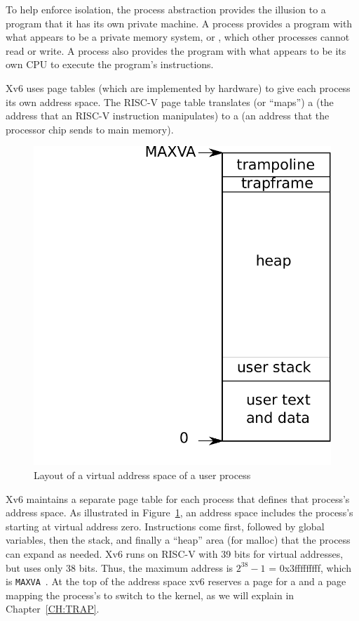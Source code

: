 To help enforce isolation, the process abstraction provides the
illusion to a program that it has its own private machine.  A process provides
a program with what appears to be a private memory system, or
, 
which other processes cannot read or write.
A process also provides the program with what appears to be its own
CPU to execute the program's instructions.

Xv6 uses page tables (which are implemented by hardware) to give each process
its own address space. The RISC-V page table
translates (or ``maps'') a
(the address that an RISC-V instruction manipulates) to a
(an address that the processor chip sends to main memory).

\begin{figure}[t]
\center
\includegraphics[scale=0.5]{fig/as.pdf}
\caption{Layout of a virtual address space of a user process}
\label{fig:as}
\end{figure}

Xv6 maintains a separate page table for each process that defines that process's
address space. As illustrated in 
Figure~\ref{fig:as},
an address space includes the process's
starting at virtual address zero. Instructions come first,
followed by global variables, then the stack,
and finally a ``heap'' area (for malloc)
that the process can expand as needed.
Xv6 runs on RISC-V with 39 bits for virtual addresses,
but uses only 38 bits.  Thus, the maximum address is $2^{38}-1$ =
0x3fffffffff, which is \lstinline{MAXVA}~.
At the top of the address space xv6 reserves a page
for a  and a page mapping
the process's 
to switch to the kernel, as we will explain in Chapter~\ref{CH:TRAP}.

